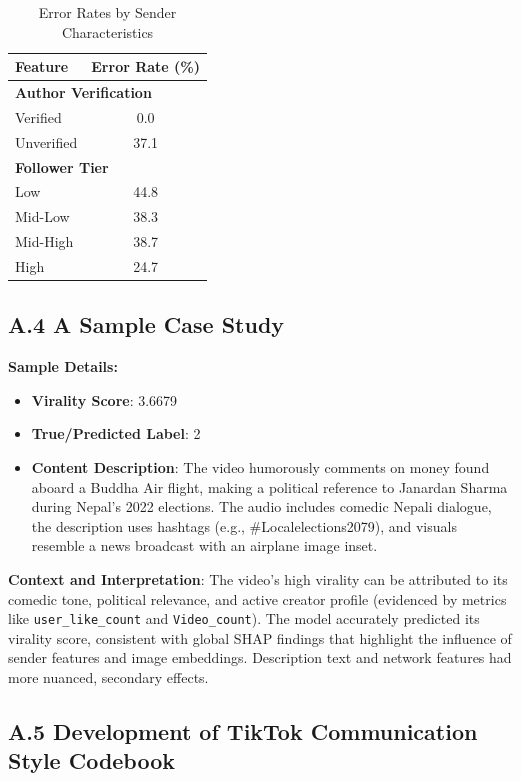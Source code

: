 \documentclass[12pt,a4paper]{report}
\begin{document}
\begin{table}[H]
\centering
\caption{Error Rates by Sender Characteristics}
\label{tab:error_by_sender}
\begin{tabular}{lc}
\toprule
\textbf{Feature} & \textbf{Error Rate (\%)} \\
\midrule
\multicolumn{2}{l}{\textbf{Author Verification}} \\
Verified & 0.0 \\
Unverified & 37.1 \\
\midrule
\multicolumn{2}{l}{\textbf{Follower Tier}} \\
Low & 44.8 \\
Mid-Low & 38.3 \\
Mid-High & 38.7 \\
High & 24.7 \\
\bottomrule
\end{tabular}
\end{table}

\subsection*{A.4 A Sample Case Study}
\label{app:samplecase}
\textbf{Sample Details:}
\begin{itemize}
    \item \textbf{Virality Score}: 3.6679
    \item \textbf{True/Predicted Label}: 2
    \item \textbf{Content Description}: The video humorously comments on money found aboard a Buddha Air flight, making a political reference to Janardan Sharma during Nepal’s 2022 elections. The audio includes comedic Nepali dialogue, the description uses hashtags (e.g., \#Localelections2079), and visuals resemble a news broadcast with an airplane image inset.
\end{itemize}

\textbf{Context and Interpretation}: The video's high virality can be attributed to its comedic tone, political relevance, and active creator profile (evidenced by metrics like \texttt{user\_like\_count} and \texttt{Video\_count}). The model accurately predicted its virality score, consistent with global SHAP findings that highlight the influence of sender features and image embeddings. Description text and network features had more nuanced, secondary effects.
\clearpage
\subsection*{A.5 Development of TikTok Communication Style Codebook}
\label{app:codebook}
\end{document}
